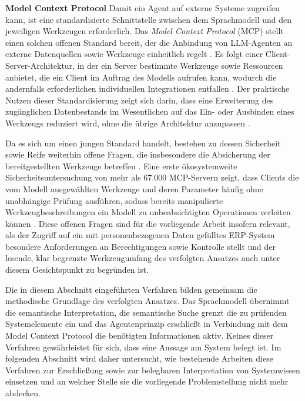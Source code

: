 \textbf{Model Context Protocol}
Damit ein Agent auf externe Systeme zugreifen kann, ist eine standardisierte Schnittstelle zwischen dem Sprachmodell und den jeweiligen Werkzeugen erforderlich. Das \emph{Model Context Protocol} (MCP) stellt einen solchen offenen Standard bereit, der die Anbindung von LLM-Agenten an externe Datenquellen sowie Werkzeuge einheitlich regelt \cite{noauthor_introducing_nodate}. Es folgt einer Client-Server-Architektur, in der ein Server bestimmte Werkzeuge sowie Ressourcen anbietet, die ein Client im Auftrag des Modells aufrufen kann, wodurch die andernfalls erforderlichen individuellen Integrationen entfallen \cite{ray_survey_2025}. Der praktische Nutzen dieser Standardisierung zeigt sich darin, dass eine Erweiterung des zugänglichen Datenbestands im Wesentlichen auf das Ein- oder Ausbinden eines Werkzeugs reduziert wird, ohne die übrige Architektur anzupassen \cite{theologitis_thucy_2026}.

Da es sich um einen jungen Standard handelt, bestehen zu dessen Sicherheit sowie Reife weiterhin offene Fragen, die insbesondere die Absicherung der bereitgestellten Werkzeuge betreffen \cite{hou_model_2025}. Eine erste ökosystemweite Sicherheitsuntersuchung von mehr als 67.000 MCP-Servern zeigt, dass Clients die vom Modell ausgewählten Werkzeuge und deren Parameter häufig ohne unabhängige Prüfung ausführen, sodass bereits manipulierte Werkzeugbeschreibungen ein Modell zu unbeabsichtigten Operationen verleiten können \cite{li_first_2026}. Diese offenen Fragen sind für die vorliegende Arbeit insofern relevant, als der Zugriff auf ein mit personenbezogenen Daten gefülltes ERP-System besondere Anforderungen an Berechtigungen sowie Kontrolle stellt und der lesende, klar begrenzte Werkzeugumfang des verfolgten Ansatzes auch unter diesem Gesichtspunkt zu begründen ist.

Die in diesem Abschnitt eingeführten Verfahren bilden gemeinsam die methodische Grundlage des verfolgten Ansatzes. Das Sprachmodell übernimmt die semantische Interpretation, die semantische Suche grenzt die zu prüfenden Systemelemente ein und das Agentenprinzip erschließt in Verbindung mit dem Model Context Protocol die benötigten Informationen aktiv. Keines dieser Verfahren gewährleistet für sich, dass eine Aussage am System belegt ist. Im folgenden Abschnitt wird daher untersucht, wie bestehende Arbeiten diese Verfahren zur Erschließung sowie zur belegbaren Interpretation von Systemwissen einsetzen und an welcher Stelle sie die vorliegende Problemstellung nicht mehr abdecken.

